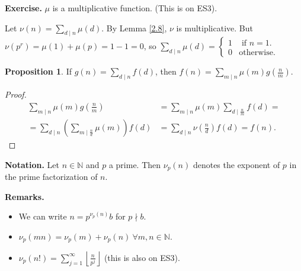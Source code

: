 \documentclass{article}
\theoremstyle{definition}
\newtheorem{prop}[theorem]{Proposition}
\begin{document}
\textbf{Exercise.} $\mu$ is a multiplicative function. (This is on ES3).
\vspace{1mm}

Let $\nu(n) = \sum_{d \mid n}^{} \mu(d)$. By Lemma \ref{2.8}, $\nu$ is multiplicative. But $\nu(p^r) = \mu(1)+\mu(p)= 1 - 1 = 0$, so $\sum_{d \mid n}^{} \mu(d) = \begin{cases}
    1 &\text{ if } n=1. \\
    0 &\text{otherwise.}
\end{cases}$
\begin{prop}
    If $g(n)=\sum_{d \mid n}^{} f(d)$, then $f(n)=\sum_{m \mid n}^{} \mu(m)g \left(\frac{n}{m}\right)$.
\end{prop}
\begin{proof}
    \begin{align*}
        \sum_{m \mid n}^{} \mu(m)g\left(\frac{n}{m}\right) &= \sum_{m \mid n}^{} \mu(m) \sum_{d \mid \frac{n}{m}}^{} f(d) = \\ 
        =\sum_{d \mid n}^{} \left( \sum_{m \mid \frac{n}{d}}^{} \mu(m)\right)f(d) &= \sum_{d \mid n}^{} \nu\left(\frac{n}{d} \right)f(d) = f(n).
    \end{align*}
\end{proof}


\textbf{Notation.} Let $n \in \mathbb{N}$ and $p$ a prime. Then $\nu_p(n)$ denotes the exponent of $p$ in the prime factorization of $n$.

\textbf{Remarks.}
\begin{itemize}
    \item We can write $n=p^{\nu_p(n)}b$ for $p \nmid b$.
    \item $\nu_p(mn)=\nu_p(m)+\nu_p(n) ~\forall m,n \in \mathbb{N}$.
    \item $\nu_p(n!)=\sum_{j=1}^{\infty} \left\lfloor \frac{n}{p^j} \right\rfloor$ (this is also on ES3).
\end{itemize} 
\end{document}
